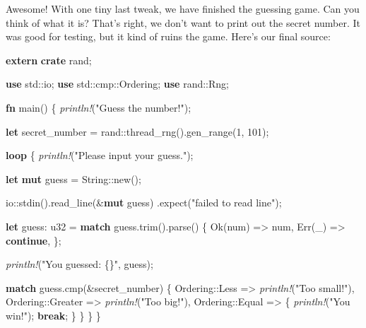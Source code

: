 \documentclass[a4paper,]{book}
\newenvironment{Shaded}{\begin{snugshade}}{\end{snugshade}}
\newcommand{\KeywordTok}[1]{\textcolor[rgb]{0.13,0.29,0.53}{\textbf{{#1}}}}
\newcommand{\DataTypeTok}[1]{\textcolor[rgb]{0.13,0.29,0.53}{{#1}}}
\newcommand{\DecValTok}[1]{\textcolor[rgb]{0.00,0.00,0.81}{{#1}}}
\newcommand{\ConstantTok}[1]{\textcolor[rgb]{0.00,0.00,0.00}{{#1}}}
\newcommand{\StringTok}[1]{\textcolor[rgb]{0.31,0.60,0.02}{{#1}}}
\newcommand{\PreprocessorTok}[1]{\textcolor[rgb]{0.56,0.35,0.01}{\textit{{#1}}}}
\newcommand{\NormalTok}[1]{{#1}}
\begin{document}
Awesome! With one tiny last tweak, we have finished the guessing game.
Can you think of what it is? That's right, we don't want to print out
the secret number. It was good for testing, but it kind of ruins the
game. Here's our final source:

\begin{Shaded}
\begin{Highlighting}[]
\KeywordTok{extern} \KeywordTok{crate} \NormalTok{rand;}

\KeywordTok{use} \NormalTok{std::io;}
\KeywordTok{use} \NormalTok{std::cmp::Ordering;}
\KeywordTok{use} \NormalTok{rand::Rng;}

\KeywordTok{fn} \NormalTok{main() \{}
    \PreprocessorTok{println!}\NormalTok{(}\StringTok{"Guess the number!"}\NormalTok{);}

    \KeywordTok{let} \NormalTok{secret_number = rand::thread_rng().gen_range(}\DecValTok{1}\NormalTok{, }\DecValTok{101}\NormalTok{);}

    \KeywordTok{loop} \NormalTok{\{}
        \PreprocessorTok{println!}\NormalTok{(}\StringTok{"Please input your guess."}\NormalTok{);}

        \KeywordTok{let} \KeywordTok{mut} \NormalTok{guess = }\DataTypeTok{String}\NormalTok{::new();}

        \NormalTok{io::stdin().read_line(&}\KeywordTok{mut} \NormalTok{guess)}
            \NormalTok{.expect(}\StringTok{"failed to read line"}\NormalTok{);}

        \KeywordTok{let} \NormalTok{guess: }\DataTypeTok{u32} \NormalTok{= }\KeywordTok{match} \NormalTok{guess.trim().parse() \{}
            \ConstantTok{Ok}\NormalTok{(num) => num,}
            \ConstantTok{Err}\NormalTok{(_) => }\KeywordTok{continue}\NormalTok{,}
        \NormalTok{\};}

        \PreprocessorTok{println!}\NormalTok{(}\StringTok{"You guessed: \{\}"}\NormalTok{, guess);}

        \KeywordTok{match} \NormalTok{guess.cmp(&secret_number) \{}
            \NormalTok{Ordering::Less    => }\PreprocessorTok{println!}\NormalTok{(}\StringTok{"Too small!"}\NormalTok{),}
            \NormalTok{Ordering::Greater => }\PreprocessorTok{println!}\NormalTok{(}\StringTok{"Too big!"}\NormalTok{),}
            \NormalTok{Ordering::Equal   => \{}
                \PreprocessorTok{println!}\NormalTok{(}\StringTok{"You win!"}\NormalTok{);}
                \KeywordTok{break}\NormalTok{;}
            \NormalTok{\}}
        \NormalTok{\}}
    \NormalTok{\}}
\NormalTok{\}}
\end{Highlighting}
\end{Shaded}
\end{document}
